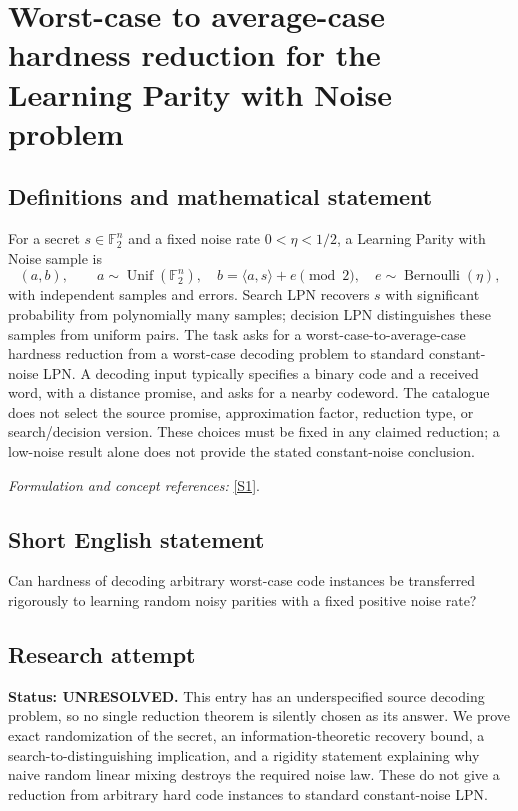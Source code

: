 \documentclass[11pt]{article}
\begin{document}
\section*{\texorpdfstring{Worst-case to average-case hardness reduction for the Learning Parity with Noise problem}{Worst-case to average-case hardness reduction for the Learning Parity with Noise problem}}\label{statement}
\subsection{Definitions and mathematical statement}
For a secret $s\in{\mathbb{F}}_2^n$ and a fixed noise rate $0<\eta<1/2$, a Learning Parity with Noise sample is
\[
 (a,b),\qquad a\sim\operatorname{Unif}({\mathbb{F}}_2^n),\quad
 b=\langle a,s\rangle+e\pmod2,\quad e\sim\operatorname{Bernoulli}(\eta),
\]
with independent samples and errors. Search LPN recovers $s$ with significant probability from polynomially many samples; decision LPN distinguishes these samples from uniform pairs. The task asks for a worst-case-to-average-case hardness reduction from a worst-case decoding problem to standard constant-noise LPN. A decoding input typically specifies a binary code and a received word, with a distance promise, and asks for a nearby codeword. The catalogue does not select the source promise, approximation factor, reduction type, or search/decision version. These choices must be fixed in any claimed reduction; a low-noise result alone does not provide the stated constant-noise conclusion.
\par\smallskip\textit{Formulation and concept references:} \href{https://eprint.iacr.org/2026/1168}{[S1]}.

\subsection{Short English statement}
Can hardness of decoding arbitrary worst-case code instances be transferred rigorously to learning random noisy parities with a fixed positive noise rate?
\subsection{Research attempt}
\textbf{Status: UNRESOLVED.} This entry has an underspecified source decoding problem, so no single reduction theorem is silently chosen as its answer. We prove exact randomization of the secret, an information-theoretic recovery bound, a search-to-distinguishing implication, and a rigidity statement explaining why naive random linear mixing destroys the required noise law. These do not give a reduction from arbitrary hard code instances to standard constant-noise LPN.
\end{document}
